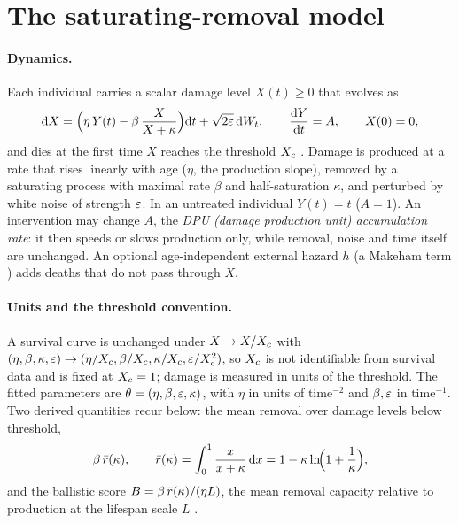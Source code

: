 \section{The saturating-removal model}\label{sec:model}

\paragraph{Dynamics.} Each individual carries a scalar damage level $X(t)\ge 0$ that evolves as
\begin{equation}\label{eq:sr}
  \mathrm{d} X = \Bigl(\eta\,Y(t) - \beta\,\frac{X}{X+\kappa}\Bigr)\mathrm{d} t + \sqrt{2\varepsilon}\,\mathrm{d} W_t,
  \qquad \frac{\mathrm{d} Y}{\mathrm{d} t} = A, \qquad X(0)=0,
\end{equation}
and dies at the first time $X$ reaches the threshold $X_c$ \citep{karin2019senescent,raz2026damage}. Damage is produced at
a rate that rises linearly with age ($\eta$, the production slope), removed by a saturating process with maximal rate
$\beta$ and half-saturation $\kappa$, and perturbed by white noise of strength $\varepsilon$. In an untreated individual
$Y(t)=t$ ($A=1$). An intervention may change $A$, the \emph{DPU (damage production unit) accumulation rate}: it then
speeds or slows production only, while removal, noise and time itself are unchanged. An optional age-independent
external hazard $h$ (a Makeham term \citep{makeham1860law}) adds deaths that do not pass through $X$.

\paragraph{Units and the threshold convention.} A survival curve is unchanged under $X\to X/X_c$ with
$(\eta,\beta,\kappa,\varepsilon)\to(\eta/X_c,\beta/X_c,\kappa/X_c,\varepsilon/X_c^2)$, so $X_c$ is not identifiable from survival
data and is fixed at $X_c=1$; damage is measured in units of the threshold. The fitted parameters are
$\theta=(\eta,\beta,\varepsilon,\kappa)$, with $\eta$ in units of $\text{time}^{-2}$ and $\beta,\varepsilon$ in $\text{time}^{-1}$.
Two derived quantities recur below: the mean removal over damage levels below threshold,
\begin{equation}\label{eq:rbar}
  \beta\,\bar r(\kappa), \qquad \bar r(\kappa) = \int_0^1 \frac{x}{x+\kappa}\,\mathrm{d} x = 1-\kappa\ln\!\Bigl(1+\frac1\kappa\Bigr),
\end{equation}
and the ballistic score $B=\beta\,\bar r(\kappa)/(\eta L)$, the mean removal capacity relative to production at the
lifespan scale $L$ \citep{raz2026damage}.

